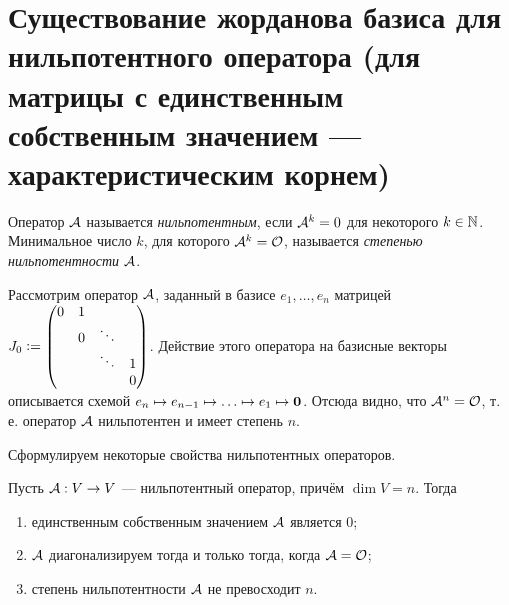 \section{Существование жорданова базиса для нильпотентного оператора (для матрицы с единственным собственным значением --- характеристическим корнем)}

\begin{definition}
    Оператор $\mathcal{A}$ называется \textit{нильпотентным}, если $\mathcal{A}^k = 0$ для некоторого $k \in \mathbb{N}$. Минимальное число $k$, для которого $\mathcal{A}^k = \mathcal{O}$, называется \textit{степенью нильпотентности} $\mathcal{A}$.
\end{definition}

\begin{example}
    Рассмотрим оператор $\mathcal{A}$, заданный в базисе $e_1, \ldots, e_n$ матрицей
    $ J_0 \vcentcolon =
    \begin{pmatrix}
         0 & 1 & & \\
         & 0 & \ddots & \\
         & & \ddots & 1 \\
         & & & 0 
    \end{pmatrix}
    $. Действие этого оператора на базисные векторы описывается схемой $e_n \mapsto e_{n - 1} \mapsto \ldots \mapsto e_1 \mapsto \boldsymbol{0}$. Отсюда видно, что $\mathcal{A}^n = \mathcal{O}$, т.\,е. оператор $\mathcal{A}$ нильпотентен и имеет степень $n$.
\end{example}

Сформулируем некоторые свойства нильпотентных операторов.

\begin{proposal}
    Пусть $\mathcal{A}: V \to V$ --- нильпотентный оператор, причём $\dim V = n$. Тогда
    \begin{enumerate}[nolistsep]
        \item единственным собственным значением $\mathcal{A}$ является $0$;
        \item $\mathcal{A}$ диагонализируем тогда и только тогда, когда $\mathcal{A} = \mathcal{O}$;
        \item степень нильпотентности $\mathcal{A}$ не превосходит $n$.
    \end{enumerate}
\end{proposal}

